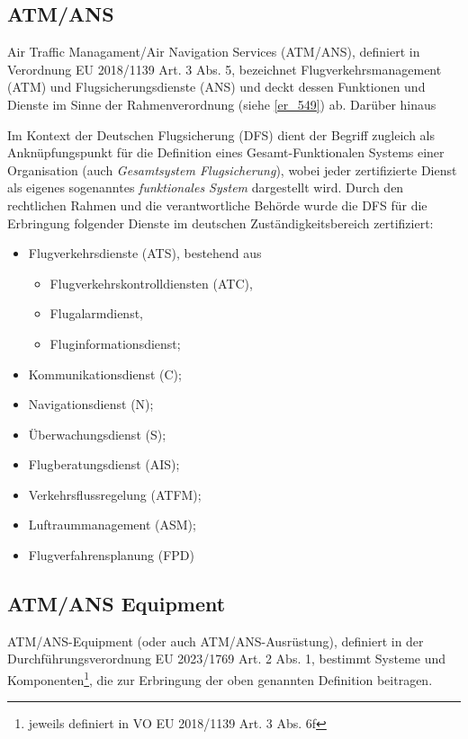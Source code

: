 \subsection{ATM/ANS}

Air Traffic Managament/Air Navigation Services (ATM/ANS), definiert in Verordnung EU 2018/1139 Art. 3 Abs. 5, bezeichnet Flugverkehrsmanagement (ATM) und Flugsicherungsdienste (ANS) und deckt dessen Funktionen und Dienste im Sinne der Rahmenverordnung (siehe \ref{er_549}) ab.
Darüber hinaus 


Im Kontext der Deutschen Flugsicherung (DFS) dient der Begriff zugleich als Anknüpfungspunkt für die Definition eines Gesamt-Funktionalen Systems einer Organisation (auch \textit{Gesamtsystem Flugsicherung}), wobei jeder zertifizierte Dienst als eigenes sogenanntes \textit{funktionales System} dargestellt wird.
Durch den rechtlichen Rahmen und die verantwortliche Behörde wurde die DFS für die Erbringung folgender Dienste im deutschen Zuständigkeitsbereich zertifiziert: \cite[17]{ba_technik}
\begin{itemize}
    \item  Flugverkehrsdienste (ATS), bestehend aus
    \begin{itemize}
        \item Flugverkehrskontrolldiensten (ATC),
        \item Flugalarmdienst,
        \item Fluginformationsdienst;
    \end{itemize}
    \item  Kommunikationsdienst (C);
    \item  Navigationsdienst (N);
    \item  Überwachungsdienst (S);
    \item  Flugberatungsdienst (AIS);
    \item  Verkehrsflussregelung (ATFM);
    \item  Luftraummanagement (ASM);
    \item  Flugverfahrensplanung (FPD)
\end{itemize}

\subsection{ATM/ANS Equipment}

ATM/ANS-Equipment (oder auch ATM/ANS-Ausrüstung), definiert in der Durchführungsverordnung EU 2023/1769 Art. 2 Abs. 1, bestimmt Systeme und Komponenten\footnote{jeweils definiert in VO EU 2018/1139 Art. 3 Abs. 6f}, die zur Erbringung der oben genannten Definition beitragen.